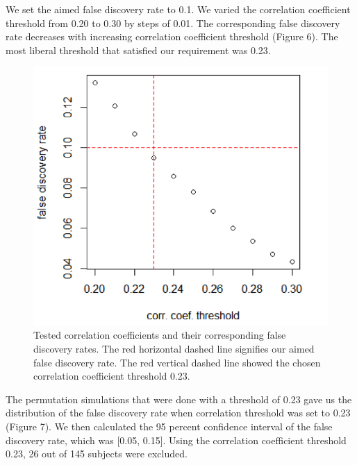 \documentclass[11pt,notitlepage]{article}
\begin{document}
We set the aimed false discovery rate to 0.1. We varied the correlation coefficient threshold from 0.20 to 0.30 by steps of 0.01. The corresponding false discovery rate decreases with increasing correlation coefficient threshold (Figure 6). The most liberal threshold that satisfied our requirement was 0.23.

\begin{figure}[h c] %
\centering
\includegraphics[scale = .70]{Figures/Part3_1.png}
\caption{\footnotesize Tested correlation coefficients and their corresponding false discovery rates. The red horizontal dashed line signifies our aimed false discovery rate. The red vertical dashed line showed the chosen correlation coefficient threshold 0.23.}
\end{figure}


The permutation simulations that were done with a threshold of 0.23 gave us the distribution of the false discovery rate when correlation threshold was set to 0.23 (Figure 7). We then calculated the 95 percent confidence interval of the false discovery rate, which was [0.05, 0.15]. Using the correlation coefficient threshold 0.23, 26 out of 145 subjects were excluded. 
\end{document}
